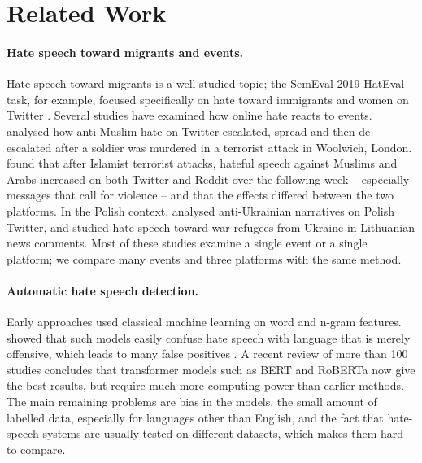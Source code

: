 \documentclass[11pt]{article}
\begin{document}
\section{Related Work}

\paragraph{Hate speech toward migrants and events.} Hate speech toward migrants is a well-studied topic; the SemEval-2019 HatEval task, for example, focused specifically on hate toward immigrants and women on Twitter \citep{basile2019}. Several studies have examined how online hate reacts to events. \citet{williams2016} analysed how anti-Muslim hate on Twitter escalated, spread and then de-escalated after a soldier was murdered in a terrorist attack in Woolwich, London. \citet{olteanu2018} found that after Islamist terrorist attacks, hateful speech against Muslims and Arabs increased on both Twitter and Reddit over the following week -- especially messages that call for violence -- and that the effects differed between the two platforms. In the Polish context, \citet{lipinska2025} analysed anti-Ukrainian narratives on Polish Twitter, and \citet{linkeviciute2025} studied hate speech toward war refugees from Ukraine in Lithuanian news comments. Most of these studies examine a single event or a single platform; we compare many events and three platforms with the same method.

\paragraph{Automatic hate speech detection.} Early approaches used classical machine learning on word and n-gram features. \citet{davidson2017} showed that such models easily confuse hate speech with language that is merely offensive, which leads to many false positives \citep[see also the survey by][]{fortuna2018}. A recent review of more than 100 studies \citep{ramos2024} concludes that transformer models such as BERT and RoBERTa now give the best results, but require much more computing power than earlier methods. The main remaining problems are bias in the models, the small amount of labelled data, especially for languages other than English, and the fact that hate-speech systems are usually tested on different datasets, which makes them hard to compare.
\end{document}
